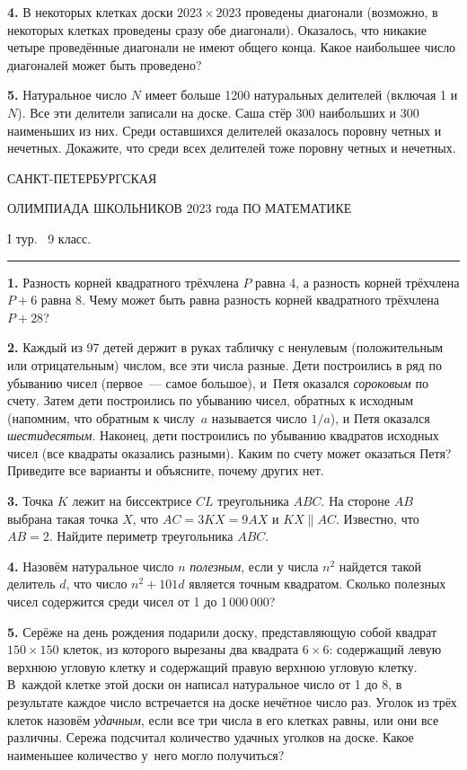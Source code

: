 \documentclass[12pt]{article}
\def\q#1.{{\bf #1. }}
\begin{document}
\q4. В некоторых клетках доски $2023 \times 2023$ проведены диагонали (возможно, в некоторых клетках проведены сразу обе диагонали). Оказалось, что никакие четыре проведённые диагонали не имеют общего конца. Какое наибольшее число диагоналей может быть проведено?

\q5. Натуральное число $N$ имеет больше 1200 натуральных делителей (включая 1 и $N$). Все эти делители записали на доске. Саша стёр 300 наибольших и 300 наименьших из них. Среди оставшихся делителей оказалось поровну четных и нечетных. Докажите, что среди всех делителей тоже поровну четных и нечетных.


\clearpage

\centerline{\sc САНКТ-ПЕТЕРБУРГСКАЯ}
\centerline{\sc ОЛИМПИАДА ШКОЛЬНИКОВ 2023 года ПО МАТЕМАТИКЕ}
\centerline{\sc I тур. \ 9 класс.}
\medskip
\hrule
\bigskip

\q1. Разность корней квадратного трёхчлена $P$ равна 4, а разность корней трёхчлена $P+6$ равна 8. Чему может быть равна разность корней квадратного трёхчлена $P+28$?

\q2. Каждый из 97 детей держит в руках табличку с ненулевым (положительным или отрицательным) числом, все эти числа разные. Дети построились в ряд по убыванию чисел (первое~--- самое большое), и~Петя оказался \emph{сороковым} по счету. Затем дети построились по убыванию чисел, обратных к исходным (напомним, что обратным к числу~$a$ называется число $1/a$), и Петя оказался \emph{шестидесятым}. Наконец, дети построились по убыванию квадратов исходных чисел (все квадраты оказались разными). Каким по счету может оказаться Петя? Приведите все варианты и объясните, почему других нет.

\q3. Точка $K$ лежит на биссектрисе $CL$ треугольника $ABC$. На стороне $AB$ выбрана такая точка $X$, что $AC=3KX=9AX$ и $KX\parallel AC$. Известно, что $AB=2$. Найдите периметр треугольника $ABC$.

\q4. Назовём натуральное число $n$ {\it полезным}, если у числа $n^2$ найдется такой делитель $d$, что число $n^2+101d$ является точным квадратом. Сколько полезных чисел содержится среди чисел от 1 до 1\,000\,000? 

\q5. Серёже на день рождения подарили доску, представляющую собой квадрат $150\times 150$ клеток, из которого вырезаны два квадрата $6\times 6$: содержащий левую верхнюю угловую клетку и содержащий правую верхнюю угловую клетку. В~каждой клетке этой доски он написал натуральное число от 1 до 8, в результате каждое число встречается на доске нечётное число раз. Уголок из трёх клеток назовём {\it удачным}, если все три числа в его клетках равны, или они все различны. Сережа подсчитал количество удачных уголков на доске. Какое наименьшее количество у~него могло получиться?
\end{document}
